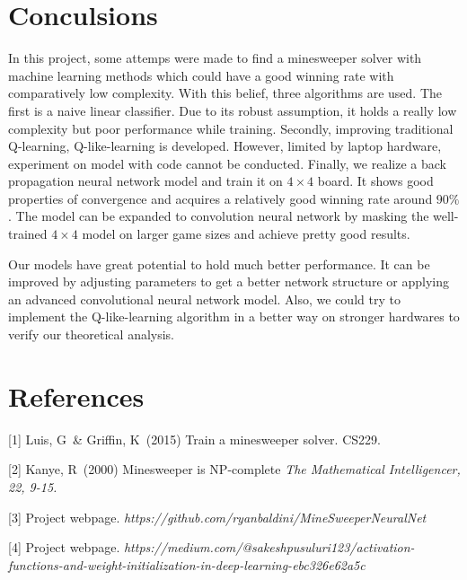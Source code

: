 \documentclass{article}
\begin{document}
\section{Conculsions}
\label{headings}
In this project, some attemps were made to find a minesweeper solver with machine learning methods which could have a good winning rate with comparatively low complexity. With this belief, three algorithms are used. The first is a naive linear classifier. Due to its robust assumption, it holds a really low complexity but poor performance while training. Secondly, improving traditional Q-learning, Q-like-learning is developed. However, limited by laptop hardware, experiment on model with code cannot be conducted. Finally, we realize a back propagation neural network model and train it on $4\times4$ board. It shows good properties of convergence and acquires a relatively good winning rate around $90\%$. The model can be expanded to convolution neural network by masking the well-trained $4\times 4$ model on larger game sizes and achieve pretty good results.

Our models have great potential to hold much better performance. It can be improved by adjusting parameters to get a better network structure or applying an advanced convolutional neural network model. Also, we could try to implement the Q-like-learning algorithm in a better way on stronger hardwares to verify our theoretical analysis.




\section*{References}


\medskip

\small

[1] Luis, G\ \& Griffin, K\ (2015) Train a minesweeper solver. CS229.

[2] Kanye, R\ (2000) Minesweeper is NP-complete {\it The Mathematical Intelligencer, 22, 9-15.}

[3] Project webpage. {\it https://github.com/ryanbaldini/MineSweeperNeuralNet}

[4] Project webpage. {\it https://medium.com/@sakeshpusuluri123/activation-functions-and-weight-initialization-in-deep-learning-ebc326e62a5c}
\end{document}
